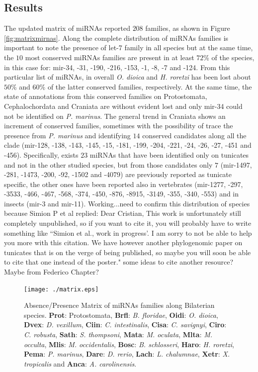 \documentclass[11pt]{article}
\newcommand{\CAVH}[1]{\begingroup\color{red}#1\endgroup}
\begin{document}
\subsection*{Results}
The updated matrix of miRNAs reported $208$ families, as shown in Figure 
\ref{fig:matrixmirnas}. Along the complete distribution of miRNAs families is 
important to note the presence of let-7 family in all species but at the same 
time, the $10$ most conserved miRNAs families are present in at least $72$\% of 
the species, in this case for: mir-34, -31, -190, -216, -153, -1, -8, -7 and 
-124. From this particular list of miRNAs, in overall \textit{O. dioica} and 
\textit{H. roretzi} has been lost about $50$\% and $60$\% of the latter 
conserved families, respectively. At the same time, the state of annotations 
from this conserved families on Protostomata, Cephalochordata and Craniata are 
without evident lost and only mir-34 could not be identified on \textsl{P. 
marinus}. The general trend in Craniata shows an increment of conserved 
families, sometimes with the possibility of trace the presence from \textit{P. 
marinus} and identifying $14$ conserved candidates along all the clade 
(mir-128, -138, -143, -145, -15, -181, -199, -204, -221, -24, -26, -27, -451 
and -456). Specifically, exists $23$ miRNAs that have been identified only on 
tunicates and not in the other studied species, but from those candidates only 
$7$ (mir-1497, -281, -1473, -200, -92, -1502 and -4079) are previously reported 
as tunicate specific, the other ones have been reported also in vertebrates 
(mir-1277, -297, -3533, -466, -467, -568, -374, -450, -876, -8915, -3149, -355,
-340, -553) and in insects (mir-3 and mir-11). \CAVH{Working...need to confirm
this distribution of species because Simion P et al replied: Dear Cristian, 
This work is unfortunately still completely unpublished, so if you want to cite 
it, you will probably have to write something like ``Simion et al., work in 
progress'. I am sorry to not be able to help you more with this citation. We 
have however another phylogenomic paper on tunicates that is on the verge of 
being published, so maybe you will soon be able to cite that one instead of the 
poster." some ideas to cite another resource? Maybe from Federico Chapter?}

\begin{figure}[htp]
\centering 
\texttt{[image: ./matrix.eps]}
\caption{Absence/Presence Matrix of miRNAs families along Bilaterian species. 
\textbf{Prot}: Protostomata, \textbf{Brfl}: \textit{B. floridae}, 
\textbf{Oidi}: \textit{O. dioica}, \textbf{Dvex}: \textit{D. vexillum}, 
\textbf{Ciin}: \textit{C. intestinalis}, \textbf{Cisa}: \textit{C. savignyi}, 
\textbf{Ciro}: \textit{C. robusta}, \textbf{Sath}: \textit{S. thompsoni}, 
\textbf{Mata}: \textit{M. oculata}, \textbf{Mlta}: \textit{M. occulta}, 
\textbf{Mlis}: \textit{M. occidentalis}, \textbf{Bosc}: \textit{B. schlosseri}, 
\textbf{Haro}: \textit{H. roretzi}, \textbf{Pema}: \textit{P. marinus}, 
\textbf{Dare}: \textit{D. rerio}, \textbf{Lach}: \textit{L. chalumnae}, 
\textbf{Xetr}: \textit{X. tropicalis} and \textbf{Anca}: \textit{A. 
carolinensis}. }
\label{fig:matrimirnas}
\end{figure}
\end{document}
